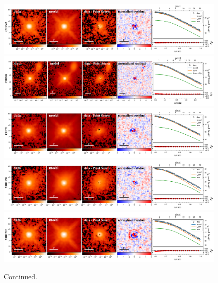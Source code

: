\documentclass[apj]{emulateapj}
\begin{document}
\begin{figure}
\centering
{
\includegraphics[height=0.25\textwidth]{fig/best_fit_CID543_SB_profile.pdf}
\includegraphics[height=0.25\textwidth]{fig/best_fit_CID607_SB_profile.pdf}
\includegraphics[height=0.25\textwidth]{fig/best_fit_CID70_SB_profile.pdf}
\includegraphics[height=0.25\textwidth]{fig/best_fit_XID2138_SB_profile.pdf}
\includegraphics[height=0.25\textwidth]{fig/best_fit_XID2202_SB_profile.pdf}
}
\caption{Continued.}
\end{figure} 
\end{document}
